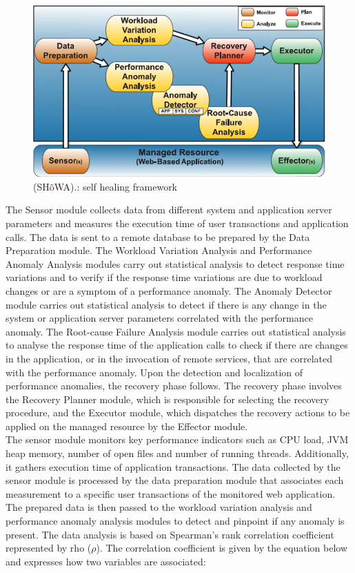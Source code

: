 \begin{compactitem}
\begin{figure}[H]
\center
\includegraphics[width=5in]{img/selfhealingframework}
\caption{(SH\~oWA).: self healing framework}
\end{figure}

The Sensor module collects data from different system and application server parameters and measures the execution time of user transactions and application calls. The data is sent to a remote database to be prepared by the Data Preparation module. The Workload Variation Analysis and Performance Anomaly Analysis modules carry out statistical analysis to detect response time variations and to verify if the response time variations are due to workload changes or are a symptom of a performance anomaly. The Anomaly Detector module carries out statistical analysis to detect if there is any change in the system or application server parameters correlated with the performance anomaly. The Root-cause Failure Analysis module carries out statistical analysis to analyse the response time of the application calls to check if there are changes in the application, or in the invocation of remote services, that are correlated with the performance anomaly. Upon the detection and localization of performance anomalies, the recovery phase follows. The recovery phase involves the Recovery Planner module, which is responsible for selecting the recovery procedure, and the Executor module, which dispatches the recovery actions to be applied on the managed resource by the Effector module.\\

The sensor module monitors key performance indicators such as CPU load, JVM heap memory, number of open files and number of running threads. Additionally, it gathers execution time of application transactions. The data collected by the sensor module is processed by the data preparation module that associates each measurement to a specific user transactions of the monitored web application. The prepared data is then passed to the workload variation analysis and performance anomaly analysis modules to detect and pinpoint if any anomaly is present. The data analysis is based on Spearman's rank correlation coefficient represented by rho ($\rho$). The correlation coefficient is given by the equation below and  expresses how two variables are associated:


\end{compactitem}

